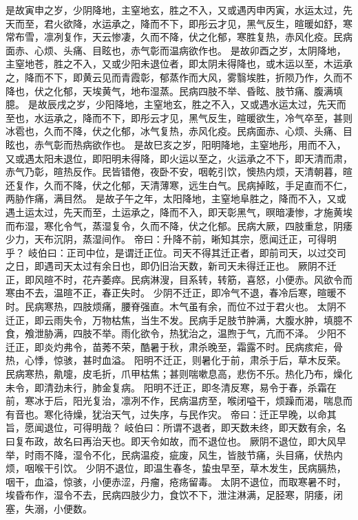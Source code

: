 \documentclass[a4paper,12pt,UTF8,twoside]{ctexbook}
\begin{document}
是故寅申之岁，少阴降地，主窒地玄，胜之不入，又或遇丙申丙寅，水运太过，先天而至，君火欲降，水运承之，降而不下，即彤云才见，黑气反生，暄暖如舒，寒常布雪，凛冽复作，天云惨凄，久而不降，伏之化郁，寒胜复热，赤风化疫。民病面赤、心烦、头痛、目眩也，赤气彰而温病欲作也。
是故卯酉之岁，太阴降地，主窒地苍，胜之不入，又或少阳未退位者，即太阴未得降也，或木运以至，木运承之，降而不下，即黄云见而青霞彰，郁蒸作而大风，雾翳埃胜，折陨乃作，久而不降也，伏之化郁，天埃黄气，地布湿蒸。民病四肢不举、昏眩、肢节痛、腹满填臆。
是故辰戌之岁，少阳降地，主窒地玄，胜之不入，又或遇水运太过，先天而至也，水运承之，降而不下，即彤云才见，黑气反生，暄暖欲生，冷气卒至，甚则冰雹也，久而不降，伏之化郁，冰气复热，赤风化疫。民病面赤、心烦、头痛、目眩也，赤气彰而热病欲作也。
是故巳亥之岁，阳明降地，主窒地彤，用而不入，又或遇太阳未退位，即阳明未得降，即火运以至之，火运承之不下，即天清而肃，赤气乃彰，暄热反作。民皆错倦，夜卧不安，咽乾引饮，懊热内烦，天清朝暮，暄还复作，久而不降，伏之化郁，天清薄寒，远生白气。民病掉眩，手足直而不仁，两胁作痛，满目然。
是故子午之年，太阳降地，主窒地阜胜之，降而不入，又或遇土运太过，先天而至，土运承之，降而不入，即天彰黑气，暝暗凄惨，才施黄埃而布湿，寒化令气，蒸湿复令，久而不降，伏之化郁。民病大厥，四肢重怠，阴痿少力，天布沉阴，蒸湿间作。
帝曰：升降不前，晰知其宗，愿闻迁正，可得明乎？
岐伯曰：正司中位，是谓迁正位。司天不得其迁正者，即前司天，以过交司之日，即遇司天太过有余日也，即仍旧治天数，新司天未得迁正也。
厥阴不迁正，即风暄不时，花卉萎瘁。民病淋溲，目系转，转筋，喜怒，小便赤。风欲令而寒由不去，温暄不正，春正失时。
少阴不迁正，即冷气不退，春冷后寒，暄暖不时。民病寒热，四肢烦痛，腰脊强直。木气虽有余，而位不过于君火也。
太阴不迁正，即云雨失令，万物枯焦，当生不发。民病手足肢节肿满，大腹水肿，填臆不食，飧泄胁满，四肢不举。雨化欲令，热犹治之，温煦于气，亢而不泽。
少阳不迁正，即炎灼弗令，苗莠不荣，酷暑于秋，肃杀晚至，霜露不时。民病痎疟，骨热，心悸，惊骇，甚时血溢。
阳明不迁正，则暑化于前，肃杀于后，草木反荣。民病寒热，鼽嚏，皮毛折，爪甲枯焦；甚则喘嗽息高，悲伤不乐。热化乃布，燥化未令，即清劲未行，肺金复病。
阳明不迁正，即冬清反寒，易令于春，杀霜在前，寒冰于后，阳光复治，凛冽不作，民病温疠至，喉闭嗌干，烦躁而渴，喘息而有音也。寒化待燥，犹治天气，过失序，与民作灾。
帝曰：迁正早晚，以命其旨，愿闻退位，可得明哉？
岐伯曰：所谓不退者，即天数未终，即天数有余，名曰复布政，故名曰再治天也。即天令如故，而不退位也。
厥阴不退位，即大风早举，时雨不降，湿令不化，民病温疫，疵废，风生，皆肢节痛，头目痛，伏热内烦，咽喉干引饮。
少阴不退位，即温生春冬，蛰虫早至，草木发生，民病膈热，咽干，血溢，惊骇，小便赤涩，丹瘤，疮疡留毒。
太阴不退位，而取寒暑不时，埃昏布作，湿令不去，民病四肢少力，食饮不下，泄注淋满，足胫寒，阴痿，闭塞，失溺，小便数。
\end{document}
